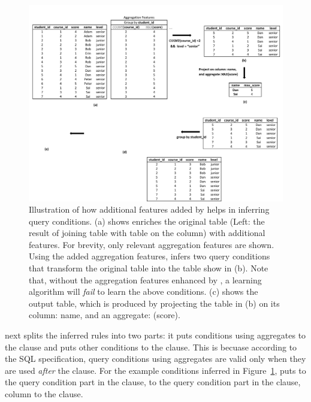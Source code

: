 \begin{figure}[t]
  \centering
  \includegraphics[scale=0.65]{fullexample}
  \vspace*{-5.0ex}\caption {{\label{fig:fullexample}
  Illustration of how additional features added by \ourtool
  helps in inferring query conditions. (a) shows \ourtool
  enriches the original table (Left: the
  result of joining table  with table
   on the  column)
  with additional features. For brevity, only relevant
  aggregation features are shown. Using the added aggregation
  features, \ourtool infers two query conditions that
  transform the original table into the table show in (b).
  Note that, without the aggregation features enhanced by
  \ourtool, a learning algorithm will \textit{fail} to learn the above conditions.
  (c) shows the output table, which is produced by projecting the
   table in (b)
  on its column: name, and an aggregate: (score).
}}

\end{figure}


\ourtool next splits the inferred rules into two parts:
it puts conditions using aggregates to the 
clause and puts other conditions to the  clause.
This is becuase according to the SQL specification,
query conditions using aggregates are valid only when they
are used \textit{after} the  clause.
For the example conditions inferred in Figure~\ref{fig:fullexample},
\ourtool puts 
to the query condition part in the  clause,
 to the
query condition part in the  clause,
column  to the  clause.


